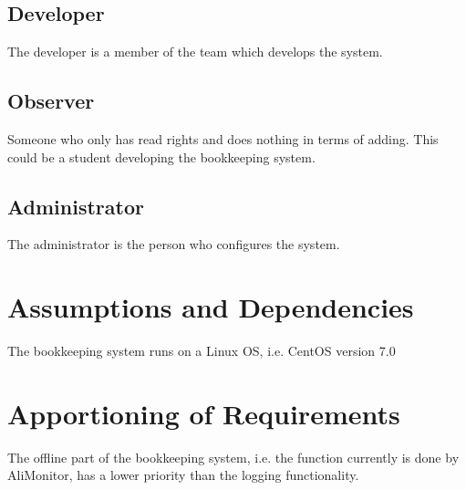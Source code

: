 \subsection{Developer}
The developer is a member of the team which develops the system. 

\subsection{Observer}
Someone who only has read rights and does nothing in terms of adding. This could be a student developing the bookkeeping system.

\subsection{Administrator}
The administrator is the person who configures the system.

\section{Assumptions and Dependencies}
The bookkeeping system runs on a Linux OS, i.e. CentOS version 7.0

\section{Apportioning of Requirements}
The offline part of the bookkeeping system, i.e. the function currently is done by AliMonitor, has a lower priority than the logging functionality.

